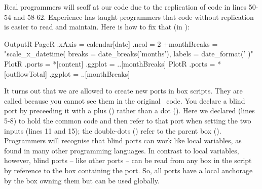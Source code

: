Real programmers will scoff at our code due to the replication of code in lines 50-54 and 58-62. Experience has taught programmers that code without replication is easier to read and maintain. Here is how to fix that (in ):

\lstset{numbers=left}
\begin{boxscript}
OutputR {
  PageR {
    .xAxis = calendar[date]
    .ncol = 2
    +monthBreaks = "scale_x_datetime(
                      breaks = date_breaks('months'), 
                      labels = date_format('%
                    )" 
    PlotR {
      .ports = *[content]
      .ggplot = ..[monthBreaks]
    }
    PlotR {
      .ports = *[outflowTotal]
      .ggplot = ..[monthBreaks]
    }
  }
} 
\end{boxscript}
\lstset{numbers=none}

It turns out that we are allowed to create new ports in box scripts. They are called  because you cannot see them in the original \CPP\ code. You declare a blind port by preceeding it with a plus (\code{+}) rather than a dot (). Here we declared  (lines 5-8) to hold the common code and then refer to that port when setting the two  inputs (lines 11 and 15); the double-dots () refer to the parent box (). Programmers will recognise that blind ports can work like local variables, as found in many other programming languages. In contrast to local variables, however, blind ports -- like other ports -- can be read from any box in the script by reference to the box containing the port. So, all ports have a local anchorage by the box owning them but can be used globally.

